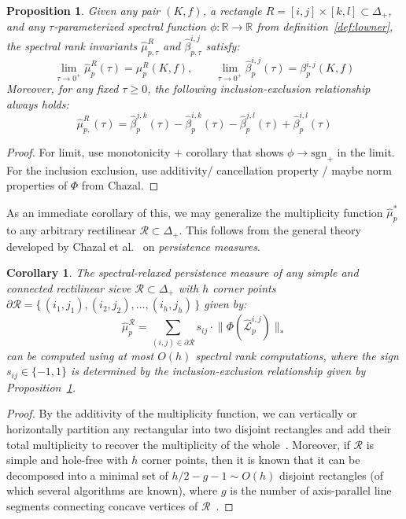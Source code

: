 \documentclass[10pt]{article}
\numberwithin{equation}{section}
\newcommand{\+}{%
	\raisebox{0.18ex}{\scaleobj{0.55}{+}}
}
\newtheorem{proposition}{Proposition}
\newtheorem{corollary}{Corollary}
\theoremstyle{definition}
\theoremstyle{definition}
\begin{document}
\begin{proposition}\label{prop:include_exclude}
Given any pair $(K, f)$, a rectangle $R = [i,j] \times [k,l] \subset \Delta_+$, and any $\tau$-parameterized spectral function $\phi: \mathbb{R} \to \mathbb{R}$ from definition~\ref{def:lowner}, the spectral rank invariants $\hat{\mu}_{p,\tau}^R$ and $\hat{\beta}_{p,\tau}^{i,j}$ satisfy: 
$$ \lim_{\tau \to 0^+ }\hat{\mu}_{p}^R(\tau) = \mu_p^R(K,f), \quad \quad \lim_{\tau \to 0^+ } \hat{\beta}_{p}^{i,j}(\tau) = \beta_{p}^{i,j}(K,f)$$
Moreover, for any fixed $\tau \geq 0$, the following inclusion-exclusion relationship always holds:
$$\hat{\mu}_{p,}^R(\tau)= \hat{\beta}_{p}^{j,k}(\tau) - \hat{\beta}_{p}^{i,k}(\tau) - \hat{\beta}_{p}^{j,l}(\tau) + \hat{\beta}_{p}^{i,l}(\tau)$$
\end{proposition}
\begin{proof}
	For limit, use monotonicity + corollary that shows $\phi \to \mathrm{sgn}_+$ in the limit. 
	For the inclusion exclusion, use additivity/ cancellation property / maybe norm properties of $\Phi$ from Chazal. 
\end{proof}
\noindent As an immediate corollary of this, we may generalize the multiplicity function $\hat{\mu}_p^\ast$ to any arbitrary rectilinear $\mathcal{R} \subset \Delta_+$. This follows from the general theory developed by Chazal et al.~\cite{chazal2016structure} on \emph{persistence measures}.
\begin{corollary}
	The spectral-relaxed \emph{persistence measure} of any simple and connected rectilinear sieve $\mathcal{R} \subset \Delta_+$ with $h$ corner points $\partial \mathcal{R} = \{ \, (i_1, j_1), (i_2, j_2), \dots,  (i_h, j_h) \, \}$ given by: 
	$$ \hat{\mu}^\mathcal{R}_p = \sum\limits_{(i,j) \in \partial \mathcal{R}} s_{ij} \cdot \lVert \Phi(\hat{\mathcal{L}}^{i,j}_p) \rVert_\ast$$
	can be computed using at most $O(h)$ spectral rank computations, where the sign $s_{ij} \in \{-1, 1\}$ is determined by the inclusion-exclusion relationship given by Proposition~\ref{prop:include_exclude}. 
\end{corollary}
\begin{proof}
	By the additivity of the multiplicity function, we can vertically or horizontally partition any rectangular into two disjoint rectangles and add their total multiplicity to recover the multiplicity of the whole~\cite{}. Moreover, if $\mathcal{R}$ is simple and hole-free with $h$ corner points, then it is known that it can be decomposed into a minimal set of $h/2-g-1 \sim O(h)$ disjoint rectangles (of which several algorithms are known), where $g$ is the number of axis-parallel line segments connecting concave vertices of $\mathcal{R}$~\cite{}.
\end{proof}
\end{document}
